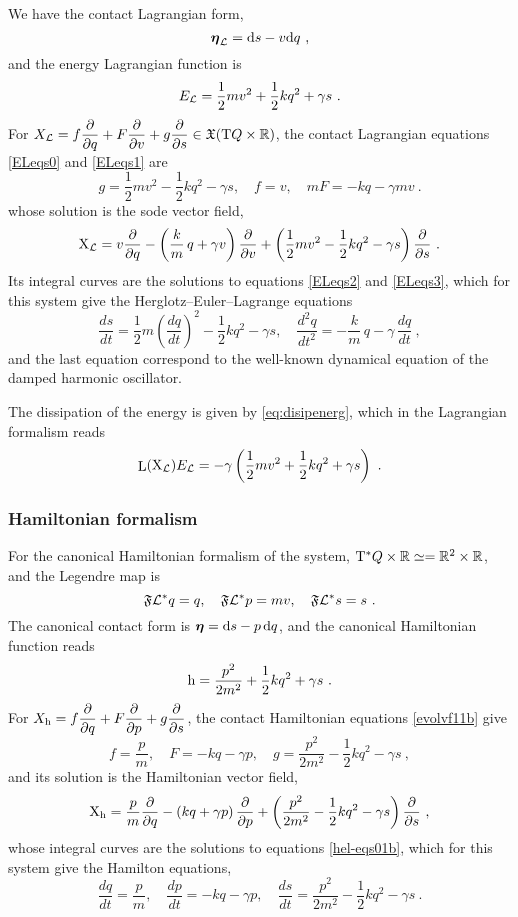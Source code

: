 \documentclass[12pt]{report}
\def\beq{\begin{equation}}
\def\eeq{\end{equation}}
\def\dst{\displaystyle}
\def\derpar#1#2{\frac{\partial{#1}}{\partial{#2}}}
\def\vf{\mathfrak X}
\def\Lag{{\cal L}}
\def\d{{\rm d}}
\def\Real{\mathbb{R}}
\def\bmeta{\mbox{\boldmath $\eta$}}
\def\X{{\rm X}}
\def\Tan{{\rm T}}
\def\Lie{\mathop{\rm L}\nolimits}
\begin{document}
We have the contact Lagrangian form,
$$
\bmeta_\Lag=\d s-v\d q \ ,
$$
and the energy Lagrangian function is
$$ 
E_\Lag = \frac{1}{2}mv^2 + \frac{1}{2}kq^2 + \gamma s \ .
$$
For $\displaystyle X_\Lag=f\derpar{}{q}+F\derpar{}{v}+g\derpar{}{s}\in\vf(\Tan Q\times\Real)$,
the contact Lagrangian equations \eqref{ELeqs0}
and \eqref{ELeqs1} are
$$
g=\frac{1}{2}mv^{2}-\frac{1}{2}kq^{2}-\gamma s ,\quad f=v ,\quad mF=-kq-\gamma mv \ .
$$
whose solution is the {\sc sode} vector field,
$$
\X_\Lag=v\frac{\partial}{\partial q}-
\left(\frac{k}{m}\,q+\gamma v\right) \frac{\partial}{\partial v}+\left(\frac{1}{2}mv^{2}-\frac{1}{2}kq^{2}-\gamma s\right)\frac{\partial}{\partial s}\ .
$$
Its integral curves are the solutions to equations \eqref{ELeqs2} and \eqref{ELeqs3},
which for this system give the Herglotz--Euler--Lagrange equations
\beq
\label{HELdho}
\frac{ds}{dt}=\frac{1}{2}m\left(\frac{dq}{dt}\right)^2-\frac{1}{2}kq^{2}-\gamma s ,\quad
\frac{d^2q}{dt^2}=-\frac{k}{m}\,q-\gamma\,\frac{dq}{dt} \ ,
\eeq
and the last equation correspond to the well-known dynamical equation of the damped harmonic oscillator. 

The dissipation of the energy is given by 
\eqref{eq:disipenerg}, which in the Lagrangian formalism reads
$$
\Lie(\X_\Lag)E_\Lag=-\gamma\left(\frac{1}{2}mv^2 + \frac{1}{2}kq^2 + \gamma s\right)\ .
$$


\subsubsection{Hamiltonian formalism}


For the canonical Hamiltonian formalism of the system, 
$\Tan^*Q\times\Real\simeq=\Real^2\times\Real$,
and the Legendre map is 
$$
\mathfrak{F}\Lag^*q=q  ,\quad \mathfrak{F}\Lag^*p=mv  ,\quad \mathfrak{F}\Lag^*s=s  \ .
$$
The canonical contact form is $\bmeta=\d s-p\,\d q$, and 
the canonical Hamiltonian function reads
$$ 
{\rm h}=\frac{p^2}{2m^2} + \frac{1}{2}kq^2 + \gamma s \ .
$$
For $\displaystyle X_{\rm h}=f\derpar{}{q}+F\derpar{}{p}+g\derpar{}{s}$,
the contact Hamiltonian equations \eqref{evolvf11b} give
$$
f=\frac{p}{m} ,\quad F=-kq-\gamma p ,\quad g=\frac{p^2}{2m^2}-\frac{1}{2}kq^2-\gamma s  \ ,
$$
and its solution is the Hamiltonian vector field,
$$
\X_{\rm h}=\frac{p}{m}\frac{\partial}{\partial q}-
\left(kq+\gamma p\right) \frac{\partial}{\partial p}+\left(\frac{p^2}{2m^2}-\frac{1}{2}kq^2-\gamma s\right)\frac{\partial}{\partial s}\ ,
$$
whose integral curves are the solutions to equations \eqref{hel-eqs01b},
which for this system give the Hamilton equations,
\beq
\label{Hdho}
\dst\frac{dq}{dt}=\frac{p}{m},\quad
\dst\frac{dp}{dt}=-kq-\gamma p,\quad
\dst\frac{ds}{dt}=\frac{p^2}{2m^2}-\frac{1}{2}kq^2-\gamma s \ .
\eeq
\end{document}
